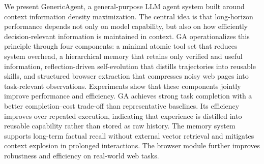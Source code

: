 We present GenericAgent, a general-purpose LLM agent system built around context information density maximization. The central idea is that long-horizon performance depends not only on model capability, but also on how efficiently decision-relevant information is maintained in context. GA operationalizes this principle through four components: a minimal atomic tool set that reduces system overhead, a hierarchical memory that retains only verified and useful information, reflection-driven self-evolution that distills trajectories into reusable skills, and structured browser extraction that compresses noisy web pages into task-relevant observations. Experiments show that these components jointly improve performance and efficiency. GA achieves strong task completion with a better completion–cost trade-off than representative baselines. Its efficiency improves over repeated execution, indicating that experience is distilled into reusable capability rather than stored as raw history. The memory system supports long-term factual recall without external vector retrieval and mitigates context explosion in prolonged interactions. The browser module further improves robustness and efficiency on real-world web tasks.